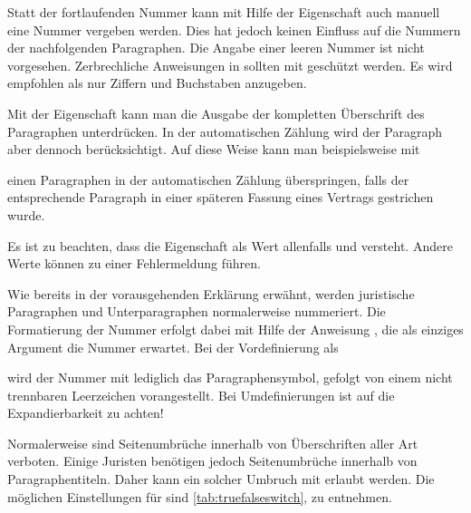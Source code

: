 Statt der fortlaufenden Nummer kann mit Hilfe der Eigenschaft
 auch manuell eine Nummer vergeben
werden. Dies hat jedoch keinen Einfluss auf die Nummern der nachfolgenden
Paragraphen. Die Angabe einer leeren Nummer ist nicht
vorgesehen. Zerbrechliche Anweisungen in  sollten mit
 geschützt werden. Es wird empfohlen als
 nur Ziffern und Buchstaben anzugeben.

Mit der Eigenschaft  kann man die
Ausgabe der kompletten Überschrift des Paragraphen unterdrücken. In der
automatischen Zählung wird der Paragraph aber dennoch berücksichtigt. Auf
diese Weise kann man beispielsweise mit
\begin{lstcode}
\end{lstcode}
einen Paragraphen in der automatischen Zählung überspringen, falls der
entsprechende Paragraph in einer späteren Fassung eines Vertrags gestrichen
wurde.

Es ist zu beachten, dass die Eigenschaft  als
Wert allenfalls  und  versteht. Andere Werte
können zu einer Fehlermeldung führen.%
\EndIndexGroup


\begin{Declaration}
\end{Declaration}
Wie bereits in der vorausgehenden Erklärung erwähnt, werden juristische
Paragraphen und Unterparagraphen normalerweise nummeriert. Die Formatierung
der Nummer erfolgt dabei mit Hilfe der Anweisung , die als
einziges Argument die Nummer erwartet. Bei der
Vordefinierung als
\begin{lstcode}
  \newcommand*{\Clauseformat}[1]{\S~#1}
\end{lstcode}
wird der Nummer mit  lediglich das Paragraphensymbol,
gefolgt von einem nicht trennbaren Leerzeichen
vorangestellt. Bei  Umdefinierungen ist auf die
Expandierbarkeit zu achten!%
\EndIndexGroup


\begin{Declaration}
\end{Declaration}%
Normalerweise sind Seitenumbrüche innerhalb von Überschriften aller Art
verboten. Einige Juristen benötigen jedoch Seitenumbrüche innerhalb von
Paragraphentiteln. Daher kann ein solcher Umbruch mit
 erlaubt
werden. Die möglichen Einstellungen für  sind
\autoref{tab:truefalseswitch},  zu
entnehmen.

